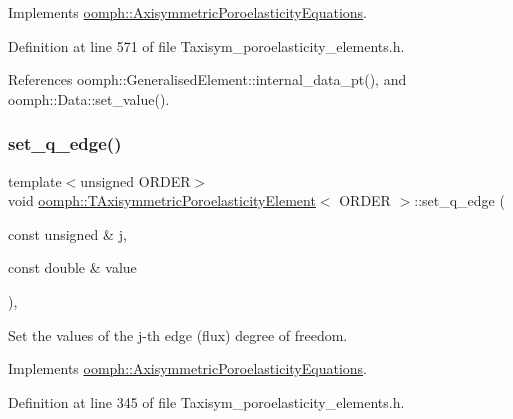 Implements \hyperlink{classoomph_1_1AxisymmetricPoroelasticityEquations_a9cd42073dd4fedcb98b578a1edbbb922}{oomph\+::\+Axisymmetric\+Poroelasticity\+Equations}.



Definition at line 571 of file Taxisym\+\_\+poroelasticity\+\_\+elements.\+h.



References oomph\+::\+Generalised\+Element\+::internal\+\_\+data\+\_\+pt(), and oomph\+::\+Data\+::set\+\_\+value().

\mbox{\label{classoomph_1_1TAxisymmetricPoroelasticityElement_aadc0873c12a2d059f49b4a2d85ec054b}} 
\subsubsection{\texorpdfstring{set\+\_\+q\+\_\+edge()}{set\_q\_edge()}\hspace{0.1cm}{\footnotesize\ttfamily [1/2]}}
{\footnotesize\ttfamily template$<$unsigned O\+R\+D\+ER$>$ \\
void \hyperlink{classoomph_1_1TAxisymmetricPoroelasticityElement}{oomph\+::\+T\+Axisymmetric\+Poroelasticity\+Element}$<$ O\+R\+D\+ER $>$\+::set\+\_\+q\+\_\+edge (\begin{DoxyParamCaption}\item[{const unsigned \&}]{j,  }\item[{const double \&}]{value }\end{DoxyParamCaption})\hspace{0.3cm}{\ttfamily [inline]}, {\ttfamily [virtual]}}



Set the values of the j-\/th edge (flux) degree of freedom. 



Implements \hyperlink{classoomph_1_1AxisymmetricPoroelasticityEquations_a40f0037981afc44e18425f472e04cb73}{oomph\+::\+Axisymmetric\+Poroelasticity\+Equations}.



Definition at line 345 of file Taxisym\+\_\+poroelasticity\+\_\+elements.\+h.



